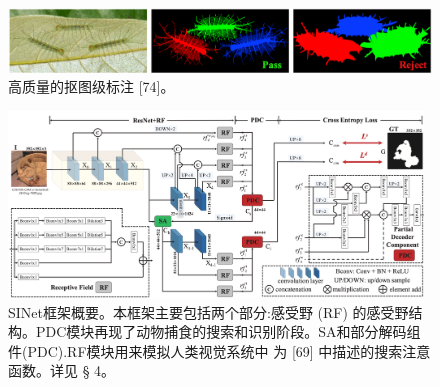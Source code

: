 \documentclass[final]{cvpr}
\begin{document}
\begin{figure}[bp]
    \centering
    \includegraphics[width=0.98\columnwidth]{COD_Zh_translate/figures/High_quality.png}\small
    \caption{ 高质量的抠图级标注 [74]。
}
    \label{fig:High_quality}
\end{figure}
\begin{figure}[t]
    \centering
    \includegraphics[width=0.98\textwidth]{COD_Zh_translate/figures/SINet_Struct.png}\small
    \caption{ SINet框架概要。本框架主要包括两个部分:感受野 (RF) 的感受野结构。PDC模块再现了动物捕食的搜索和识别阶段。SA和部分解码组件(PDC).RF模块用来模拟人类视觉系统中 为 [69] 中描述的搜索注意函数。详见 § 4。}
    \label{fig:SINet_Struct}
\end{figure}
\end{document}
